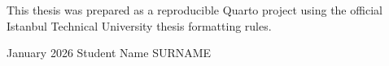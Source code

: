 This thesis was prepared as a reproducible Quarto project using the official
Istanbul Technical University thesis formatting rules.

\vspace{10mm}
\noindent January 2026 \hfill Student Name SURNAME
